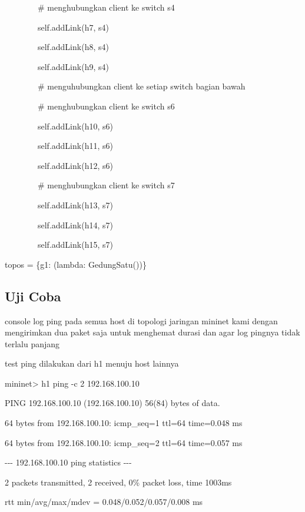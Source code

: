 \bigskip

\ \ \ \ \ \ \ \ \# menghubungkan client ke switch s4

\ \ \ \ \ \ \ \ self.addLink(h7, s4)

\ \ \ \ \ \ \ \ self.addLink(h8, s4)

\ \ \ \ \ \ \ \ self.addLink(h9, s4)


\bigskip

\ \ \ \ \ \ \ \ \# menguhubungkan client ke setiap switch bagian bawah

\ \ \ \ \ \ \ \ \# menghubungkan client ke switch s6

\ \ \ \ \ \ \ \ self.addLink(h10, s6)

\ \ \ \ \ \ \ \ self.addLink(h11, s6)

\ \ \ \ \ \ \ \ self.addLink(h12, s6)


\bigskip

\ \ \ \ \ \ \ \ \# menghubungkan client ke switch s7

\ \ \ \ \ \ \ \ self.addLink(h13, s7)

\ \ \ \ \ \ \ \ self.addLink(h14, s7)

\ \ \ \ \ \ \ \ self.addLink(h15, s7)


\bigskip

topos = \{{\textquotedbl}g1{\textquotedbl}: (lambda: GedungSatu())\}


\subsection{Uji Coba}
console log ping pada semua host di topologi jaringan mininet kami dengan mengirimkan dua paket saja untuk menghemat
durasi dan agar log pingnya tidak terlalu panjang 

test ping dilakukan dari h1 menuju host lainnya

\bigskip

mininet{\textgreater} h1 ping -c 2 192.168.100.10

PING 192.168.100.10 (192.168.100.10) 56(84) bytes of data.

64 bytes from 192.168.100.10: icmp\_seq=1 ttl=64 time=0.048 ms

64 bytes from 192.168.100.10: icmp\_seq=2 ttl=64 time=0.057 ms


\bigskip

{}-{}-{}- 192.168.100.10 ping statistics -{}-{}-

2 packets transmitted, 2 received, 0\% packet loss, time 1003ms

rtt min/avg/max/mdev = 0.048/0.052/0.057/0.008 ms

